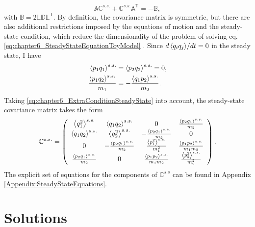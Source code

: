 %
\begin{equation}
  \mathbb{A}\mathbb{C}^{s.s.} +
  \mathbb{C}^{s.s.}\mathbb{A}^\mathsf{T}
  =
  -\mathbb{B},
  \label{eq:chapter6_SteadyStateEquationToyModel}
\end{equation}
%
with $\mathbb{B} = 2 \mathbb{L}\mathbb{D}\mathbb{L}^\mathsf{T}$. By definition, the covariance matrix is  symmetric, but there are also  additional restrictions imposed by the equations of motion and the steady-state condition, which reduce the dimensionality of the problem of solving eq. \eqref{eq:chapter6_SteadyStateEquationToyModel} \cite{Simon2019}. Since ${d \expval{ q_i q_j }}/{dt} = 0$ in the steady state, I have
%
\begin{align}
  \expval{ p_1 q_1}^{s.s.} &= \expval{ p_2 q_2}^{s.s.} = 0,\nonumber\\
  \frac{\expval{ p_1 q_2}^{s.s.}}{m_1}&=-\frac{\expval{ q_1 p_2}^{s.s.}}{m_2}.
  \label{eq:chapter6_ExtraConditionSteadyState}
\end{align}
%
Taking \eqref{eq:chapter6_ExtraConditionSteadyState} into account, the steady-state covariance matrix takes the form
%
\begin{equation}
  \begin{split}
    \mathbb{C}^{s.s.} =
    \left(
    \begin{array}{cccc}
      \expval{ q_1^2}^{s.s.}  & \expval{ q_1 q_2}^{s.s.}  & 0 & \frac{\expval{ p_2 q_1}^{s.s.} }{m_2} \\
      \expval{ q_1 q_2}^{s.s.}  & \expval{ q_2^2}^{s.s.}  & -\frac{\expval{ p_2 q_1}^{s.s.} }{m_2} & 0 \\
      0 & -\frac{\expval{ p_2 q_1}^{s.s.} }{m_2} & \frac{\expval{ p_1^2}^{s.s.} }{m_1^2} & \frac{\expval{ p_1 p_2}^{s.s.} }{m_1 m_2} \\
      \frac{\expval{ p_2 q_1}^{s.s.} }{m_2} & 0 & \frac{\expval{ p_1 p_2}^{s.s.} }{m_1 m_2} & \frac{\expval{ p_2^2}^{s.s.} }{m_2^2} \\
      \end{array}
      \right)
    \end{split}
    \label{eq:chapter6_steadyStateCovarianceMatrix}\,.
\end{equation}
%
The explicit set of equations for the components of $\mathbb{C}^{s.s}$ can be found in Appendix \ref{Appendix:SteadyStateEquations}.
%
%
%
%
%
\section{Solutions\label{sec:solutions}}
%
%
%
%

